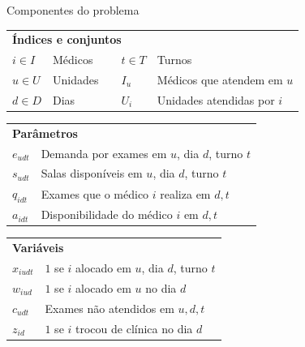 \begin{frame}{Componentes do problema}
    \begin{small}
        \begin{longtable}[l]{lllll}
            \multicolumn{5}{l}{\textbf{Índices e conjuntos}} \\
            $i \in I$ & Médicos & \quad & $t \in T$ & Turnos \\
            $u \in U$ & Unidades & \quad & $I_u$ & Médicos que atendem em $u$ \\
            $d \in D$ & Dias & \quad & $U_i$ & Unidades atendidas por $i$ \\
        \end{longtable}

        \begin{longtable}[l]{ll}
            \multicolumn{2}{l}{\textbf{Parâmetros}} \\
            $e_{udt}$ & Demanda por exames em $u$, dia $d$, turno $t$ \\
            $s_{udt}$ & Salas disponíveis em $u$, dia $d$, turno $t$ \\
            $q_{idt}$ & Exames que o médico $i$ realiza em $d,t$ \\
            $a_{idt}$ & Disponibilidade do médico $i$ em $d,t$ \\
        \end{longtable}

        \begin{longtable}[l]{ll}
            \multicolumn{2}{l}{\textbf{Variáveis}} \\
            $x_{iudt}$ & $1$ se $i$ alocado em $u$, dia $d$, turno $t$ \\
            $w_{iud}$ & $1$ se $i$ alocado em $u$ no dia $d$ \\
            $c_{udt}$ & Exames não atendidos em $u,d,t$ \\
            $z_{id}$ & $1$ se $i$ trocou de clínica no dia $d$ \\
        \end{longtable}
    \end{small}
\end{frame}

